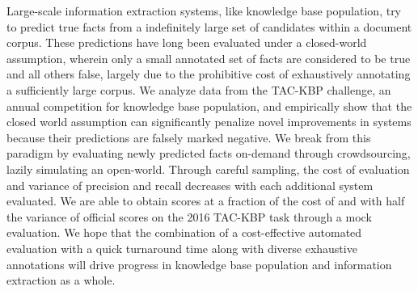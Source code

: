 Large-scale information extraction systems, like knowledge base population, try to predict true facts from a indefinitely large set of candidates within a document corpus.
These predictions have long been evaluated under a closed-world assumption, wherein only a small annotated set of facts are considered to be true and all others false, largely due to the prohibitive cost of exhaustively annotating a sufficiently large corpus.
We analyze data from the TAC-KBP challenge, an annual competition for knowledge base population, and empirically show that the closed world assumption can significantly penalize novel improvements in systems because their predictions are falsely marked negative.
We break from this paradigm by evaluating newly predicted facts on-demand through crowdsourcing, lazily simulating an open-world. 
Through careful sampling, the cost of evaluation and variance of precision and recall decreases with each additional system evaluated.
We are able to obtain scores at a fraction of the cost of and with half the variance of official scores on the 2016 TAC-KBP task through a mock evaluation.
We hope that the combination of a cost-effective automated evaluation with a quick turnaround time along with diverse exhaustive annotations will drive progress in knowledge base population and information extraction as a whole.



